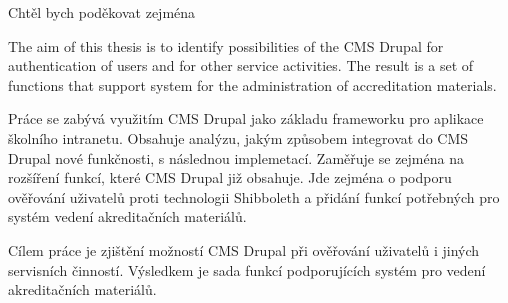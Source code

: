 \documentclass[11pt,twoside,a4paper]{book}
\begin{document}

\coverpagestarts


\acknowledgements
\noindent
\par
Chtěl bych poděkovat zejména 




 
\abstractpage
\noindent
The aim of this thesis is to identify possibilities of the CMS Drupal for authentication of users and for other service activities. The result is a set of functions that support system for the administration of accreditation materials.


\baselineskip

\noindent
\par
Práce se zabývá využitím CMS Drupal jako základu frameworku pro aplikace školního intranetu. Obsahuje analýzu, jakým způsobem integrovat do CMS Drupal nové funkčnosti, s následnou implemetací. Zaměřuje se zejména na rozšíření funkcí, které CMS Drupal již obsahuje. Jde zejména o podporu ověřování uživatelů proti technologii Shibboleth a přidání funkcí potřebných pro systém vedení akreditačních materiálů.

\par
Cílem práce je zjištění možností CMS Drupal při ověřování uživatelů i jiných servisních činností. Výsledkem je sada funkcí podporujících systém pro vedení akreditačních materiálů.


\tableofcontents



\listoffigures



\listoftables


\end{document}
